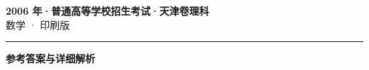 \documentclass[zihao=5, a4paper]{ctexart}
\begin{document}
\begin{center}
  {\Large\bfseries 2006 年·普通高等学校招生考试·天津卷理科}\\[4pt]
  {\large 数学 · 印刷版}
\end{center}
\medskip
{}

\par\bigskip\hrule\bigskip
{}
\begin{center}{\large\bfseries 参考答案与详细解析}\end{center}
\smallskip

\end{document}
